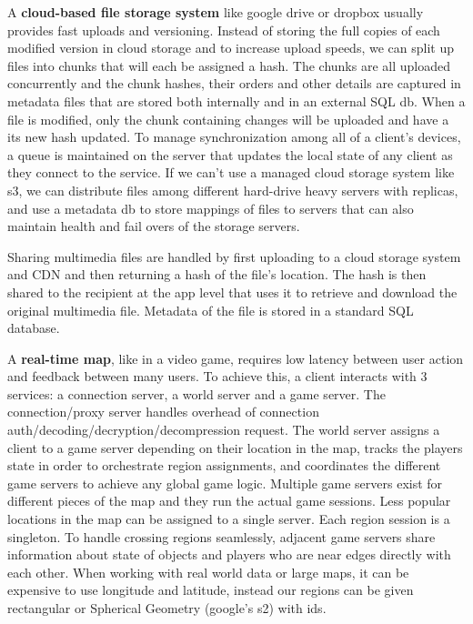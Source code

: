 \documentclass{article}
\begin{document}
    A \textbf{cloud-based file storage system} like google drive or dropbox usually provides fast uploads and versioning. Instead of storing the full copies of each modified version in cloud storage and to increase upload speeds, we can split up files into chunks that will each be assigned a hash. The chunks are all uploaded concurrently and the chunk hashes, their orders and other details are captured in metadata files that are stored both internally and in an external SQL db. When a file is modified, only the chunk containing changes will be uploaded and have a its new hash updated. To manage synchronization among all of a client's devices, a queue is maintained on the server that updates the local state of any client as they connect to the service. If we can't use a managed cloud storage system like s3, we can distribute files among different hard-drive heavy servers with replicas, and use a metadata db to store mappings of files to servers that can also maintain health and fail overs of the storage servers.
    
    Sharing multimedia files are handled by first uploading to a cloud storage system and CDN and then returning a hash of the file's location. The hash is then shared to the recipient at the app level that uses it to retrieve and download the original multimedia file. Metadata of the file is stored in a standard SQL database.
    
    A \textbf{real-time map}, like in a video game, requires low latency between user action and feedback between many users. To achieve this, a client interacts with 3 services: a connection server, a world server and a game server. The connection/proxy server handles overhead of connection auth/decoding/decryption/decompression request. The world server assigns a client to a game server depending on their location in the map, tracks the players state in order to orchestrate region assignments, and coordinates the different game servers to achieve any global game logic. Multiple game servers exist for different pieces of the map and they run the actual game sessions. Less popular locations in the map can be assigned to a single server. Each region session is a singleton. To handle crossing regions seamlessly, adjacent game servers share information about state of objects and players who are near edges directly with each other. When working with real world data or large maps, it can be expensive to use longitude and latitude, instead our regions can be given rectangular or Spherical Geometry (google's s2) with ids.
    
\end{document}
